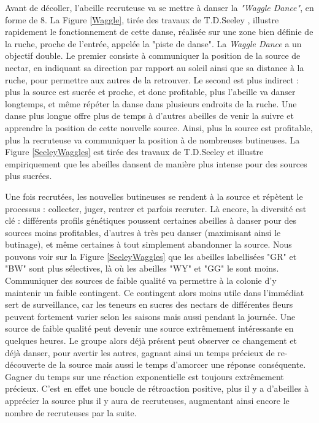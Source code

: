 	Avant de décoller, l'abeille recruteuse va se mettre à danser la \textit{"Waggle Dance"}, en forme de 8. La Figure \ref{Waggle}, tirée des travaux de T.D.Seeley \cite{seeley_wisdom_1995}, illustre rapidement le fonctionnement de cette danse, réalisée sur une zone bien définie de la ruche, proche de l'entrée, appelée la "piste de danse". La \textit{Waggle Dance} a un objectif double. Le premier consiste à communiquer la position de la source de nectar, en indiquant sa direction par rapport au soleil ainsi que sa distance à la ruche, pour permettre aux autres de la retrouver. Le second est plus indirect : plus la source est sucrée et proche, et donc profitable, plus l'abeille va danser longtemps, et même répéter la danse dans plusieurs endroits de la ruche. Une danse plus longue offre plus de temps à d'autres abeilles de venir la suivre et apprendre la position de cette nouvelle source. Ainsi, plus la source est profitable, plus la recruteuse va communiquer la position à de nombreuses butineuses. La Figure \ref{SeeleyWaggles} est tirée des travaux de T.D.Seeley \cite{seeley_wisdom_1995} et illustre empiriquement que les abeilles dansent de manière plus intense pour des sources plus sucrées.
			
			Une fois recrutées, les nouvelles butineuses se rendent à la source et répètent le processus : collecter, juger, rentrer et parfois recruter. Là encore, la diversité est clé : différents profils génétiques poussent certaines abeilles à danser pour des sources moins profitables, d'autres à très peu danser (maximisant ainsi le butinage), et même certaines à tout simplement abandonner la source. Nous pouvons voir sur la Figure \ref{SeeleyWaggles} que les abeilles labellisées "GR" et "BW" sont plus sélectives, là où les abeilles "WY" et "GG" le sont moins. Communiquer des sources de faible qualité va permettre à la colonie d'y maintenir un faible contingent. Ce contingent alors moins utile dans l'immédiat sert de surveillance, car les teneurs en sucres des nectars de différentes fleurs peuvent fortement varier selon les saisons mais aussi pendant la journée. 
			Une source de faible qualité peut devenir une source extrêmement intéressante en quelques heures. Le groupe alors déjà présent peut observer ce changement et déjà danser, pour avertir les autres, gagnant ainsi un temps précieux de re-découverte de la source mais aussi le temps d'amorcer une réponse conséquente. Gagner du temps sur une réaction exponentielle est toujours extrêmement précieux. 
			C'est en effet une boucle de rétroaction positive, plus il y a d'abeilles à apprécier la source plus il y aura de recruteuses, augmentant ainsi encore le nombre de recruteuses par la suite.
			

